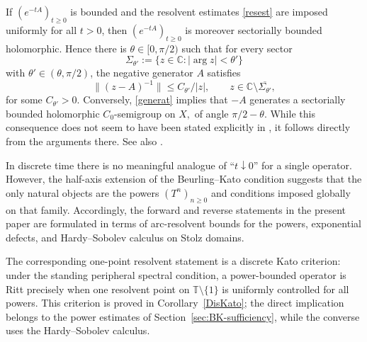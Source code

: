 \documentclass[11pt]{amsart}
\numberwithin{equation}{section}
\theoremstyle{definition}
\theoremstyle{plain}
\def\T{\mathbb{T}}
\begin{document}
If $(e^{-tA})_{t\ge0}$ is bounded and the 
 resolvent estimates \eqref{resest} are imposed uniformly for all $t>0$, 
then \((e^{-tA})_{t\ge0}\) is moreover sectorially bounded holomorphic.
Hence there is \(\theta\in[0,\pi/2)\) such that for every sector
\[
  \Sigma_{\theta'}:=\{z\in\mathbb C:|\arg z|<\theta'\}
\]
with \(\theta'\in(\theta,\pi/2)\), the negative generator \(A\)
satisfies
\begin{equation}\label{generat}
  \|(z-A)^{-1}\|
  \le C_{\theta'}/|z|,
  \qquad z\in\mathbb C\setminus\overline{\Sigma_{\theta'}},
\end{equation}
for some \(C_{\theta'}>0\).
Conversely,  \eqref{generat} implies that $-A$ generates a sectorially bounded holomorphic $C_0$-semigroup on $X,$ of angle $\pi/2-\theta.$
While this consequence does not seem to have been stated explicitly in \cite{Beurling,Kato}, it follows directly from the arguments there. See also \cite{Fackler}.

In discrete time there is no meaningful analogue of ``$t\downarrow0$'' for a single operator. However, the half-axis extension of the Beurling--Kato condition suggests that the only natural objects are the powers $(T^n)_{n\ge0}$ and conditions imposed globally on that family. Accordingly, the forward and reverse statements in the present paper are formulated in terms of arc-resolvent bounds for the powers, exponential defects, and Hardy--Sobolev calculus on Stolz domains.

The corresponding one-point resolvent statement is a discrete Kato criterion: under the standing peripheral spectral condition, a power-bounded operator is Ritt precisely when one resolvent point on $\T\setminus\{1\}$ is uniformly controlled for all powers.  This criterion is proved in Corollary~\ref{DisKato}; the direct implication belongs to the power estimates of Section~\ref{sec:BK-sufficiency}, while the converse uses the Hardy--Sobolev calculus.

\end{document}
